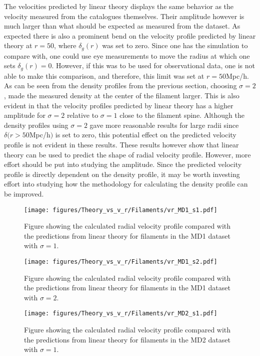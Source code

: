 The velocities predicted by linear theory displays the same behavior as the velocity measured from the catalogues themselves. Their amplitude however is much larger than what should be expected as measured from the dataset. As expected there is also a prominent bend on the velocity profile predicted by linear theory at $r=50$, where $\delta_g(r)$ was set to zero. Since one has the simulation to compare with, one could use eye measurements to move the radius at which one sets $\delta_g(r)=0$. However, if this was to be used for observational data, one is not able to make this comparison, and therefore, this limit was set at $r=50$Mpc/h. As can be seen from the density profiles from the previous section, choosing $\sigma=2$, made the measured density at the center of the filament larger. This is also evident in that the velocity profiles predicted by linear theory has a higher amplitude for $\sigma=2$ relative to $\sigma=1$ close to the filament spine. Although the density profiles using $\sigma=2$ gave more reasonable results for large radii since $\delta(r>50$Mpc/h$)$ is set to zero, this potential effect on the predicted velocity profile is not evident in these results. These results however show that linear theory can be used to predict the shape of radial velocity profile. However, more effort should be put into studying the amplitude. Since the predicted velocity profile is directly dependent on the density profile, it may be worth investing effort into studying how the methodology for calculating the density profile can be improved. 


\begin{figure}[H]
    \texttt{[image: figures/Theory\_vs\_v\_r/Filaments/vr\_MD1\_s1.pdf]}
    \caption{Figure showing the calculated radial velocity profile compared with the predictions from linear theory for filaments in the MD1 dataset with $\sigma=1$.}
    \label{fig:filvrMD1s1}
\end{figure}

\begin{figure}[H]
    \texttt{[image: figures/Theory\_vs\_v\_r/Filaments/vr\_MD1\_s2.pdf]}
    \caption{Figure showing the calculated radial velocity profile compared with the predictions from linear theory for filaments in the MD1 dataset with $\sigma=2$.}
    \label{fig:filvrMD1s2}
\end{figure}

\begin{figure}[H]
    \texttt{[image: figures/Theory\_vs\_v\_r/Filaments/vr\_MD2\_s1.pdf]}
    \caption{Figure showing the calculated radial velocity profile compared with the predictions from linear theory for filaments in the MD2 dataset with $\sigma=1$.}
    \label{fig:filvrMD2s1}
\end{figure}

